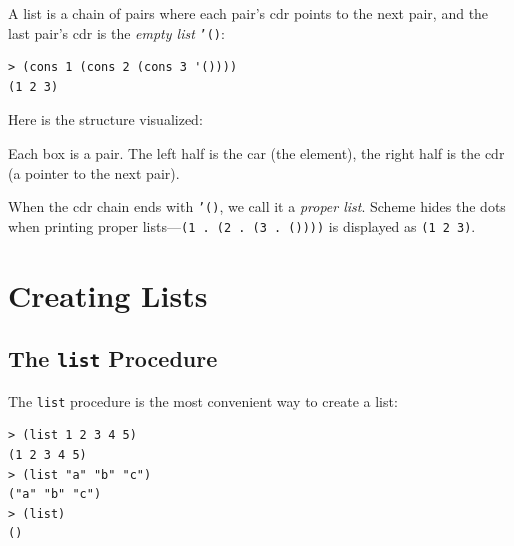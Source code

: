 A list is a chain of pairs where each pair's cdr points to the next pair, and the last pair's cdr is the \emph{empty list} \texttt{'()}:

\begin{lstlisting}[style=repl]
> (cons 1 (cons 2 (cons 3 '())))
(1 2 3)
\end{lstlisting}

Here is the structure visualized:

\begin{center}
\end{center}

Each box is a pair. The left half is the car (the element), the right half is the cdr (a pointer to the next pair).

When the cdr chain ends with \texttt{'()}, we call it a \emph{proper list}. Scheme hides the dots when printing proper lists---\texttt{(1 . (2 . (3 . ())))} is displayed as \texttt{(1 2 3)}.

\section{Creating Lists}

\subsection{The \texttt{list} Procedure}

The \texttt{list} procedure is the most convenient way to create a list:

\begin{lstlisting}[style=repl]
> (list 1 2 3 4 5)
(1 2 3 4 5)
> (list "a" "b" "c")
("a" "b" "c")
> (list)
()
\end{lstlisting}

